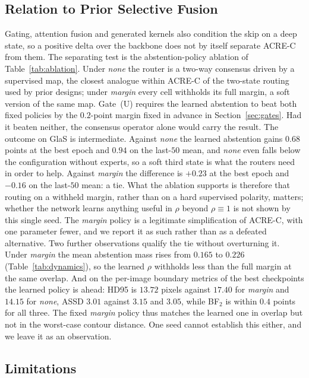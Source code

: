 \subsection{Relation to Prior Selective Fusion}

Gating, attention fusion and generated kernels also condition the skip on a deep state, so a positive delta over the backbone does not by itself separate ACRE-C from them. The separating test is the abstention-policy ablation of Table~\ref{tab:ablation}. Under \emph{none} the router is a two-way consensus driven by a supervised map, the closest analogue within ACRE-C of the two-state routing used by prior designs; under \emph{margin} every cell withholds its full margin, a soft version of the same map. Gate~(U) requires the learned abstention to beat both fixed policies by the $0.2$-point margin fixed in advance in Section~\ref{sec:gates}. Had it beaten neither, the consensus operator alone would carry the result. The outcome on GlaS is intermediate. Against \emph{none} the learned abstention gains $0.68$ points at the best epoch and $0.94$ on the last-$50$ mean, and \emph{none} even falls below the configuration without experts, so a soft third state is what the routers need in order to help. Against \emph{margin} the difference is $+0.23$ at the best epoch and $-0.16$ on the last-$50$ mean: a tie. What the ablation supports is therefore that routing on a withheld margin, rather than on a hard supervised polarity, matters; whether the network learns anything useful in $\rho$ beyond $\rho\equiv1$ is not shown by this single seed. The \emph{margin} policy is a legitimate simplification of ACRE-C, with one parameter fewer, and we report it as such rather than as a defeated alternative. Two further observations qualify the tie without overturning it. Under \emph{margin} the mean abstention mass rises from $0.165$ to $0.226$ (Table~\ref{tab:dynamics}), so the learned $\rho$ withholds less than the full margin at the same overlap. And on the per-image boundary metrics of the best checkpoints the learned policy is ahead: HD95 is $13.72$ pixels against $17.40$ for \emph{margin} and $14.15$ for \emph{none}, ASSD $3.01$ against $3.15$ and $3.05$, while BF$_2$ is within $0.4$ points for all three. The fixed \emph{margin} policy thus matches the learned one in overlap but not in the worst-case contour distance. One seed cannot establish this either, and we leave it as an observation.

\subsection{Limitations}


